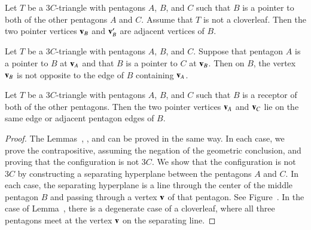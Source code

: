 \begin{lemma} 
Let $T$ be a $3C$-triangle with pentagons $A$, $B$, and $C$ such that
$B$ is a pointer to both of the other pentagons $A$ and $C$.  
Assume that $T$ is not a cloverleaf.
Then the two pointer vertices ${\mathbf v}_B$ and ${\mathbf v}_B'$ are adjacent
vertices of $B$.
\end{lemma}

\begin{lemma}  
Let $T$ be a $3C$-triangle with pentagons $A$, $B$, and $C$.
Suppose that pentagon
$A$ is a pointer to $B$ at ${\mathbf v}_A$ and that $B$ is a pointer to $C$
at ${\mathbf v}_B$.  Then on $B$, the vertex
${\mathbf v}_B$ is not opposite to the edge of $B$ containing
${\mathbf v}_A$.
\end{lemma}

\begin{lemma} 
  Let $T$ be a $3C$-triangle with pentagons $A$, $B$, and $C$ such
  that $B$ is a receptor of both of the other pentagons.  Then the two
  pointer vertices ${\mathbf v}_A$ and ${\mathbf v}_C$ lie on the same edge or adjacent
  pentagon edges of $B$.
\end{lemma}





\begin{proof} The Lemmas~, , and
   can be proved in the same way.  In each case, we
  prove the contrapositive, assuming the negation of the geometric
  conclusion, and proving that the configuration is not $3C$.  We show
  that the configuration is not $3C$ by constructing a separating
  hyperplane between the pentagons $A$ and $C$.  In each case, the
  separating hyperplane is a line through the center of the middle
  pentagon $B$ and passing through a vertex ${\mathbf v}$ of that pentagon.  See
  Figure~.  In the case of Lemma~, there
  is a degenerate case of a cloverleaf, where all three pentagons meet
  at the vertex ${\mathbf v}$ on the separating line.
\end{proof}


